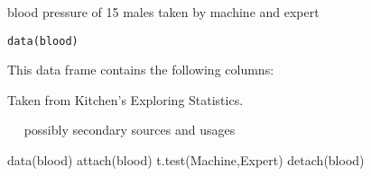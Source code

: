 \begin{Description}\relax
blood pressure of 15 males taken by machine and expert
\end{Description}
\begin{Usage}
\begin{verbatim}data(blood)\end{verbatim}
\end{Usage}
\begin{Format}\relax
This data frame contains the following columns:
\end{Format}
\begin{Source}\relax
Taken from Kitchen's Exploring Statistics.
\end{Source}
\begin{References}\relax
~~ possibly secondary sources and usages ~~
\end{References}
\begin{Examples}
\begin{ExampleCode}
data(blood)
attach(blood)
t.test(Machine,Expert)
detach(blood)
\end{ExampleCode}
\end{Examples}

